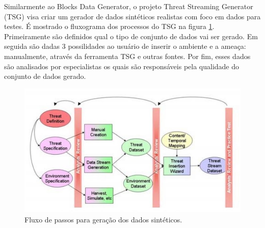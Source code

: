 \documentclass[
	12pt,				%
	openright,			%
	twoside,			%
	a4paper,			%
	english,			%
	brazil				%
	]{abntex2}
\begin{document}
		Similarmente ao Blocks Data Generator, o projeto Threat Streaming Generator (TSG) \cite{Whiting2008} visa criar um gerador de dados sintéticos realistas com foco em dados para testes.
		É mostrado o fluxograma dos processos do TSG na figura \ref{fig:whitingetal}.
		Primeiramente são definidos qual o tipo de conjunto de dados vai ser gerado.
		Em seguida são dadas 3 possilidades ao usuário de inserir o ambiente e a ameaça: manualmente, através da ferramenta TSG e outras fontes.
		Por fim, esses dados são analisados por especialistas os quais são responsáveis pela qualidade do conjunto de dados gerado.
		\begin{figure}[h!]
			\centering
			\includegraphics[width=\linewidth]{./figures/TrabalhosRelacionados/whitingetal.jpg}
			\caption{Fluxo de passos para geração dos dados sintéticos.}
			\label{fig:whitingetal}
		\end{figure}
\end{document}
